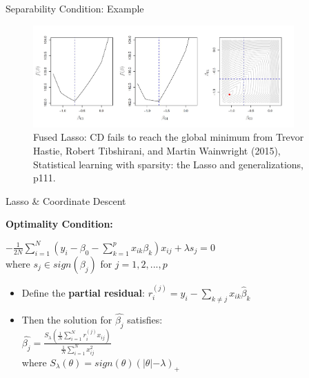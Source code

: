 \documentclass[handout]{beamer}
\begin{document}
\begin{frame}{Separability Condition: Example}
\begin{figure}[h]
\centering
\includegraphics[width=10cm]{img/Fused}
\caption{ Fused Lasso: CD fails to reach the global minimum from Trevor Hastie, Robert Tibshirani, and Martin Wainwright (2015), Statistical learning with sparsity: the Lasso and generalizations, p111.}
\end{figure}
\end{frame}

\begin{frame}{Lasso \& Coordinate Descent}

\textbf{Optimality Condition:}
\vspace*{4mm}

\(-\frac{1}{2N}\sum_{i=1}^{N}(y_{i}-\beta_0-\sum_{k=1}^{p}x_{ik}\beta_k)x_{ij}+ \lambda s_j=0\)
\vspace*{4mm}
 \\where \(s_j \in sign(\beta_j)\) for \(j=1,2,...,p\)
 \vspace*{6mm}
 \begin{itemize}
     \item Define the \textbf{partial residual}: \(r_{i}^{(j)}=y_i-\sum_{k\neq j}x_{ik}\hat{\beta}_k\)
    \item Then the solution for \(\hat{\beta_j}\) satisfies:\\
\vspace*{4mm}
    \(\hat{\beta_j}=\frac{S_{\lambda}(\frac{1}{N}\sum_{i=1}^{N}r_i^{(j)}       x_{ij} )}{\frac{1}{N}\sum_{i=1}^{N}x_{ij}^2}\)\\
\vspace*{4mm}
    where \(S_{\lambda}(\theta) =sign(\theta)(\lvert\theta\lvert-\lambda)_{+}\)
\end{itemize}
    
\end{frame}
\end{document}
